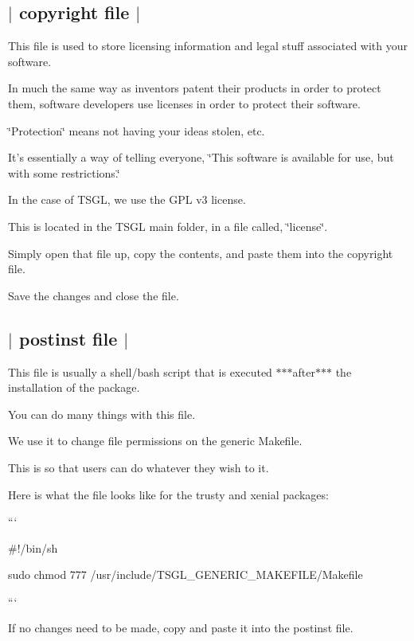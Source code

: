  \subsection*{$\vert$ {\ttfamily copyright} file $\vert$ }

This file is used to store licensing information and legal stuff associated with your software.

In much the same way as inventors patent their products in order to protect them, software developers use licenses in order to protect their software.

\char`\"{}\-Protection\char`\"{} means not having your ideas stolen, etc.

It's essentially a way of telling everyone, \char`\"{}\-This software is available for use, but with some restrictions.\char`\"{}

In the case of T\-S\-G\-L, we use the G\-P\-L v3 license.

This is located in the T\-S\-G\-L main folder, in a file called, \char`\"{}license\char`\"{}.

Simply open that file up, copy the contents, and paste them into the {\ttfamily copyright} file.

Save the changes and close the file. 

 \subsection*{$\vert$ {\ttfamily postinst} file $\vert$ }

This file is usually a shell/bash script that is executed $\ast$$\ast$$\ast$after$\ast$$\ast$$\ast$ the installation of the package.

You can do many things with this file.

We use it to change file permissions on the generic Makefile.

This is so that users can do whatever they wish to it.

Here is what the file looks like for the {\ttfamily trusty} and {\ttfamily xenial} packages\-:

``` \begin{DoxyVerb}#!/bin/sh

sudo chmod 777 /usr/include/TSGL_GENERIC_MAKEFILE/Makefile
\end{DoxyVerb}


```

If no changes need to be made, copy and paste it into the {\ttfamily postinst} file.


